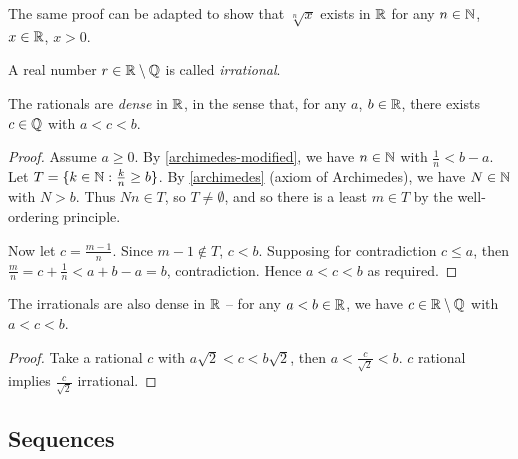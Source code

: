 \documentclass{../../template/note}
\begin{document}
    \begin{remark*}
        The same proof can be adapted to show that \(\sqrt[n]{x}\) exists in \(\mathbb R\) for any \(n \in \mathbb N\), \(x \in \mathbb R\), \(x > 0\).
    \end{remark*}
    
    \begin{definition}
        A real number \(r \in \mathbb R \setminus \mathbb Q\) is called \emph{irrational}.
    \end{definition}

    
    

    \begin{proposition}
        The rationals are \emph{dense} in \(\mathbb R\), in the sense that, for any \(a\), \(b \in \mathbb R\), there exists \(c \in \mathbb Q\) with \(a < c < b\). 
    \end{proposition}
    
    \begin{proof}
        Assume \(a \geq 0\). By \cref{archimedes-modified}, we have \(n \in \mathbb N\) with \(\frac{1}{n} < b-a\). Let \(T = \{k \in \mathbb N: \frac{k}{n} \geq b\}\). By \cref{archimedes} (axiom of Archimedes), we have \(N \in \mathbb N\) with \(N > b\). Thus \(Nn \in T\), so \(T \neq \emptyset\), and so there is a least \(m \in T\) by the well-ordering principle.

        Now let \(c = \frac{m-1}{n}\). Since \(m-1 \notin T\), \(c < b\). Supposing for contradiction \(c \leq a\), then \(\frac{m}{n} = c + \frac 1 n < a + b - a = b\), contradiction. Hence \(a < c < b\) as required.
    \end{proof}
    
    \begin{proposition}
        The irrationals are also dense in \(\mathbb R\) -- for any \(a < b \in \mathbb R\), we have \(c \in \mathbb R \setminus \mathbb Q\) with \(a < c < b\).
    \end{proposition}
    
    \begin{proof}
        Take a rational \(c\) with \(a\sqrt{2} < c < b\sqrt{2}\), then \(a < \frac{c}{\sqrt 2} < b\). \(c\) rational implies \(\frac{c}{\sqrt 2}\) irrational.
    \end{proof}
    
    \subsection{Sequences}
\end{document}
